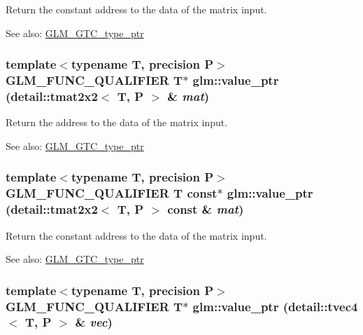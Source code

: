 Return the constant address to the data of the matrix input. \begin{Desc}
\item[See also:]\hyperlink{group__gtc__type__ptr}{GLM\_\-GTC\_\-type\_\-ptr} \end{Desc}
\hypertarget{group__gtc__type__ptr_g2005106958abf8304187586557d11444}{
\subsubsection[value\_\-ptr]{\setlength{\rightskip}{0pt plus 5cm}template$<$typename T, precision P$>$ GLM\_\-FUNC\_\-QUALIFIER T$\ast$ glm::value\_\-ptr (detail::tmat2x2$<$ T, P $>$ \& {\em mat})}}
\label{group__gtc__type__ptr_g2005106958abf8304187586557d11444}


Return the address to the data of the matrix input. \begin{Desc}
\item[See also:]\hyperlink{group__gtc__type__ptr}{GLM\_\-GTC\_\-type\_\-ptr} \end{Desc}
\hypertarget{group__gtc__type__ptr_g97a60e78c46993259f0cbac724d0b354}{
\subsubsection[value\_\-ptr]{\setlength{\rightskip}{0pt plus 5cm}template$<$typename T, precision P$>$ GLM\_\-FUNC\_\-QUALIFIER T const$\ast$ glm::value\_\-ptr (detail::tmat2x2$<$ T, P $>$ const \& {\em mat})}}
\label{group__gtc__type__ptr_g97a60e78c46993259f0cbac724d0b354}


Return the constant address to the data of the matrix input. \begin{Desc}
\item[See also:]\hyperlink{group__gtc__type__ptr}{GLM\_\-GTC\_\-type\_\-ptr} \end{Desc}
\hypertarget{group__gtc__type__ptr_g793e108db1bc068a8c09cf75c1b04389}{
\subsubsection[value\_\-ptr]{\setlength{\rightskip}{0pt plus 5cm}template$<$typename T, precision P$>$ GLM\_\-FUNC\_\-QUALIFIER T$\ast$ glm::value\_\-ptr (detail::tvec4$<$ T, P $>$ \& {\em vec})}}
\label{group__gtc__type__ptr_g793e108db1bc068a8c09cf75c1b04389}



